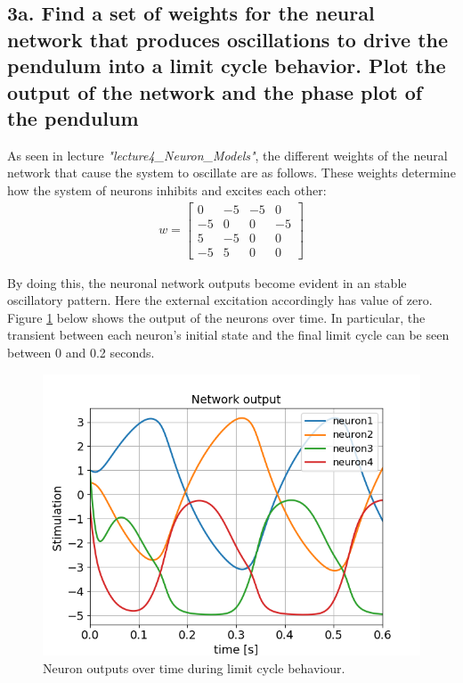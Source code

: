 \documentclass{cmc}
\begin{document}
\subsection*{3a. Find a set of weights for the neural network that
  produces oscillations to drive the pendulum into a limit cycle
  behavior. Plot the output of the network and the phase plot of
the pendulum}
\label{sec:4a}

As seen in lecture \textit{"lecture4\_Neuron\_Models"}, the different weights of the neural network that cause the system to oscillate are as follows. These weights determine how the system of neurons inhibits and excites each other: 
\begin{eqnarray}
    w = \left[
        \begin{array}{rrrr}
            0 & -5 & -5 & 0 \\
            -5 & 0 & 0 & -5 \\
            5 & -5 & 0 & 0 \\
            -5 & 5 & 0 & 0
        \end{array}
    \right]
    \label{mat:neuron_weights}
\end{eqnarray}

By doing this, the neuronal network outputs become evident in an stable oscillatory pattern. Here the external excitation accordingly has value of zero. Figure \ref{fig:3a_NeuronSimulations} below shows the output of the neurons over time. In particular, the transient between each neuron's initial state and the final limit cycle can be seen between 0 and 0.2 seconds. 

\begin{figure}[H]
      \centering
      \includegraphics[width=.65\textwidth]{3a/3a-output.png}
      \caption{Neuron outputs over time during limit cycle behaviour.}
      \label{fig:3a_NeuronSimulations}
\end{figure}
\end{document}
